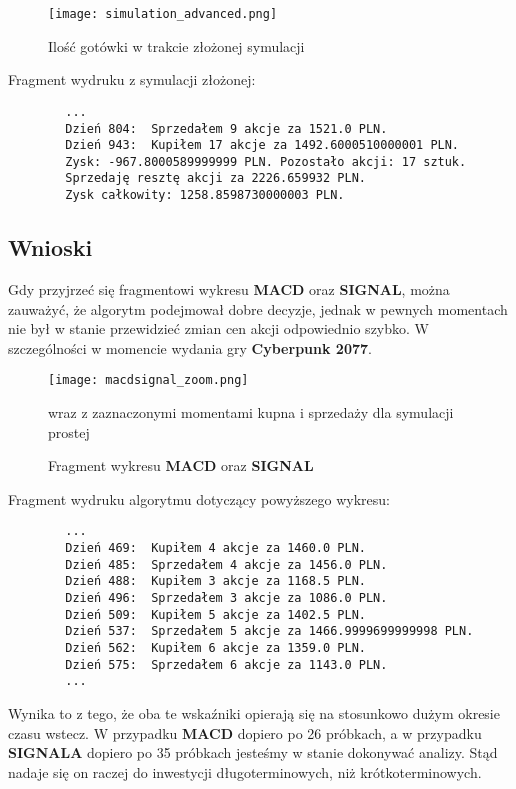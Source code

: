 \documentclass{article}
\begin{document}
    \begin{figure}[H]
        \texttt{[image: simulation\_advanced.png]}
        \centering
        \caption{Ilość gotówki w trakcie złożonej symulacji}
    \end{figure}

Fragment wydruku z symulacji złożonej:
    \begin{verbatim}
        ...
        Dzień 804:  Sprzedałem 9 akcje za 1521.0 PLN.
        Dzień 943:  Kupiłem 17 akcje za 1492.6000510000001 PLN.
        Zysk: -967.8000589999999 PLN. Pozostało akcji: 17 sztuk.
        Sprzedaję resztę akcji za 2226.659932 PLN.
        Zysk całkowity: 1258.8598730000003 PLN.
    \end{verbatim}

    \subsection{Wnioski}

    Gdy przyjrzeć się fragmentowi wykresu \textbf{MACD} oraz \textbf{SIGNAL}, można zauważyć, że
    algorytm podejmował dobre decyzje, jednak w pewnych momentach nie był w stanie przewidzieć
    zmian cen akcji odpowiednio szybko. W szczególności w momencie wydania gry \textbf{Cyberpunk 2077}.

    \begin{figure}[H]
        \texttt{[image: macdsignal\_zoom.png]}
        \centering
        \caption{Fragment wykresu \textbf{MACD} oraz \textbf{SIGNAL}}{ wraz z zaznaczonymi momentami kupna i sprzedaży
        dla symulacji prostej}
        \label{fig:macdsignal_zoom}
    \end{figure}

    Fragment wydruku algorytmu dotyczący powyższego wykresu:
    \begin{verbatim}
        ...
        Dzień 469:  Kupiłem 4 akcje za 1460.0 PLN.
        Dzień 485:  Sprzedałem 4 akcje za 1456.0 PLN.
        Dzień 488:  Kupiłem 3 akcje za 1168.5 PLN.
        Dzień 496:  Sprzedałem 3 akcje za 1086.0 PLN.
        Dzień 509:  Kupiłem 5 akcje za 1402.5 PLN.
        Dzień 537:  Sprzedałem 5 akcje za 1466.9999699999998 PLN.
        Dzień 562:  Kupiłem 6 akcje za 1359.0 PLN.
        Dzień 575:  Sprzedałem 6 akcje za 1143.0 PLN.
        ...
    \end{verbatim}

    Wynika to z tego, że oba te wskaźniki opierają się na stosunkowo dużym
    okresie czasu wstecz. W przypadku \textbf{MACD} dopiero po 26 próbkach, a w przypadku \textbf{SIGNALA}
    dopiero po 35 próbkach jesteśmy w stanie dokonywać analizy. Stąd nadaje się
    on raczej do inwestycji długoterminowych, niż krótkoterminowych.
\end{document}
